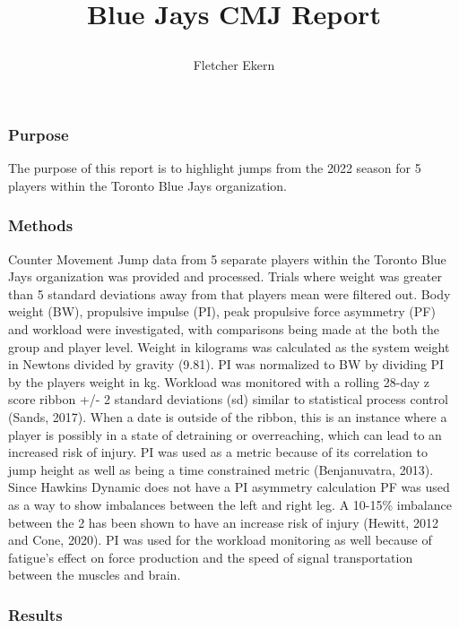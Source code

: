 \documentclass[
  12pt,
]{article}
\title{\vspace{-3.5cm}

Blue Jays CMJ Report}
\author{Fletcher Ekern}
\date{}
\begin{document}
\maketitle

\hypertarget{purpose}{%
\subsubsection{Purpose}\label{purpose}}

The purpose of this report is to highlight jumps from the 2022 season
for 5 players within the Toronto Blue Jays organization.

\hypertarget{methods}{%
\subsubsection{Methods}\label{methods}}

Counter Movement Jump data from 5 separate players within the Toronto
Blue Jays organization was provided and processed. Trials where weight
was greater than 5 standard deviations away from that players mean were
filtered out. Body weight (BW), propulsive impulse (PI), peak propulsive
force asymmetry (PF) and workload were investigated, with comparisons
being made at the both the group and player level. Weight in kilograms
was calculated as the system weight in Newtons divided by gravity
(9.81). PI was normalized to BW by dividing PI by the players weight in
kg. Workload was monitored with a rolling 28-day z score ribbon +/- 2
standard deviations (sd) similar to statistical process control (Sands,
2017). When a date is outside of the ribbon, this is an instance where a
player is possibly in a state of detraining or overreaching, which can
lead to an increased risk of injury. PI was used as a metric because of
its correlation to jump height as well as being a time constrained
metric (Benjanuvatra, 2013). Since Hawkins Dynamic does not have a PI
asymmetry calculation PF was used as a way to show imbalances between
the left and right leg. A 10-15\% imbalance between the 2 has been shown
to have an increase risk of injury (Hewitt, 2012 and Cone, 2020). PI was
used for the workload monitoring as well because of fatigue's effect on
force production and the speed of signal transportation between the
muscles and brain.

\hypertarget{results}{%
\subsubsection{Results}\label{results}}
\end{document}
